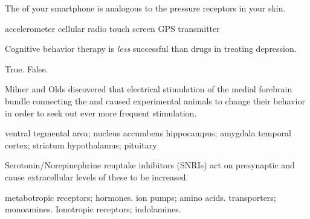 \documentclass[answers]{exam}
\begin{document}
\begin{questions}
\newpage


\question The \fillin of your smartphone is analogous to the pressure receptors in your skin.
\begin{choices}
\choice accelerometer
\choice cellular radio
\correctchoice touch screen
\choice GPS transmitter
\end{choices}

\question Cognitive behavior therapy is \emph{less} successful than drugs in treating depression.
\begin{choices}
\choice True.
\correctchoice False.
\end{choices}

\question Milner and Olds discovered that electrical stimulation of the medial forebrain bundle connecting the \fillin and \fillin caused experimental animals to change their behavior in order to seek out ever more frequent stimulation.
\begin{choices}
\correctchoice ventral tegmental area; nucleus accumbens
\choice hippocampus; amygdala
\choice temporal cortex; striatum
\choice hypothalamus; pituitary
\end{choices}


\question Serotonin/Norepinephrine reuptake inhibitors (SNRIs) act on presynaptic \fillin and cause extracellular levels of these \fillin to be increased.
\begin{choices}
\choice metabotropic receptors; hormones.
\choice ion pumps; amino acids.
\correctchoice transporters; monoamines.
\choice Ionotropic receptors; indolamines.
\end{choices}


\end{questions}
\end{document}
